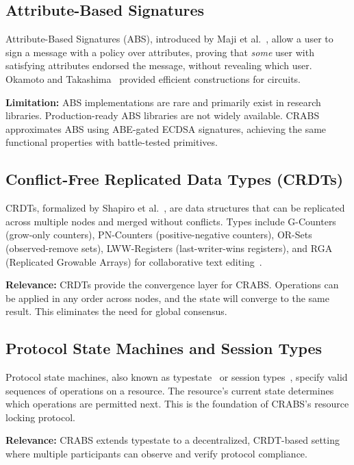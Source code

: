 \documentclass[sigconf,nonacm]{acmart}
\newcommand{\crab}{\textsc{CRABS}}
\begin{document}
\subsection{Attribute-Based Signatures}

Attribute-Based Signatures (ABS), introduced by Maji et al.~\cite{maji2011abs}, allow a user to sign a message with a policy over attributes, proving that \textit{some} user with satisfying attributes endorsed the message, without revealing which user. Okamoto and Takashima~\cite{okamoto2011abs} provided efficient constructions for circuits.

\textbf{Limitation:} ABS implementations are rare and primarily exist in research libraries. Production-ready ABS libraries are not widely available. \crab{} approximates ABS using ABE-gated ECDSA signatures, achieving the same functional properties with battle-tested primitives.

\subsection{Conflict-Free Replicated Data Types (CRDTs)}

CRDTs, formalized by Shapiro et al.~\cite{shapiro2011crdt}, are data structures that can be replicated across multiple nodes and merged without conflicts. Types include G-Counters (grow-only counters), PN-Counters (positive-negative counters), OR-Sets (observed-remove sets), LWW-Registers (last-writer-wins registers), and RGA (Replicated Growable Arrays) for collaborative text editing~\cite{levien2016rga}.

\textbf{Relevance:} CRDTs provide the convergence layer for \crab{}. Operations can be applied in any order across nodes, and the state will converge to the same result. This eliminates the need for global consensus.

\subsection{Protocol State Machines and Session Types}

Protocol state machines, also known as typestate~\cite{deline2004typestate} or session types~\cite{honda1998session}, specify valid sequences of operations on a resource. The resource's current state determines which operations are permitted next. This is the foundation of \crab{}'s resource locking protocol.

\textbf{Relevance:} \crab{} extends typestate to a decentralized, CRDT-based setting where multiple participants can observe and verify protocol compliance.
\end{document}
